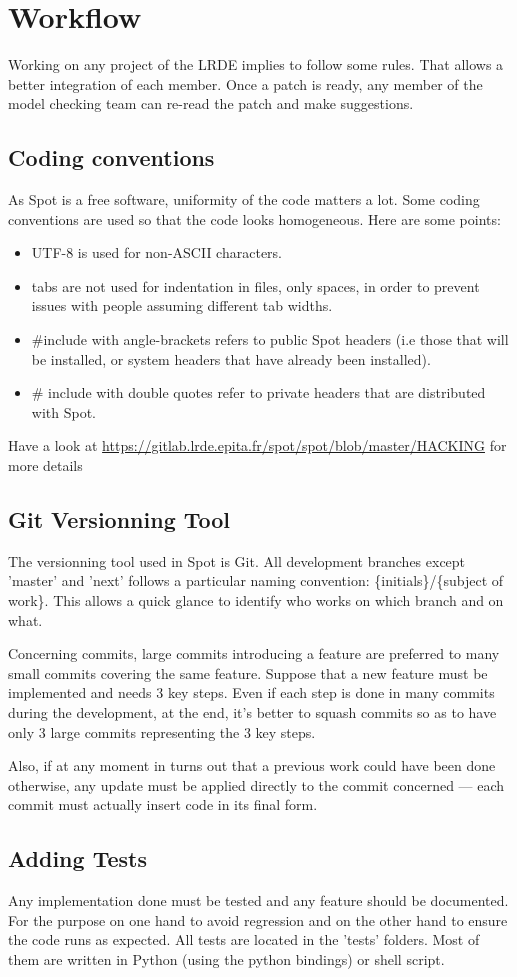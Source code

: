 \section{Workflow}
Working on any project of the LRDE implies to follow some rules. That allows a better integration of each
member. Once a patch is ready, any member of the model checking team can re-read the patch and make
suggestions.

\subsection{Coding conventions}
As Spot is a free software, uniformity of the code matters a lot. Some coding conventions are used so that
the code looks homogeneous. Here are some points:
\begin{itemize}
 \item UTF-8 is used for non-ASCII characters.
 \item tabs are not used for indentation in files, only spaces, in order to prevent issues with people
 assuming different tab widths.
 \item \#include with angle-brackets refers to public Spot headers (i.e those that will be installed, or
 system headers that have already been installed).
 \item \# include with double quotes refer to private headers that are distributed with Spot.
\end{itemize}

Have a look at \url{https://gitlab.lrde.epita.fr/spot/spot/blob/master/HACKING} for more details

\subsection{Git Versionning Tool}
The versionning tool used in Spot is Git. All development branches except 'master' and 'next' follows a
particular naming convention: \{initials\}/\{subject of work\}. This allows a quick glance to identify
who works on which branch and on what.

Concerning commits, large commits introducing a feature are preferred to many small commits covering
the same feature. Suppose that a new feature must be implemented and needs 3 key steps. Even if each step
is done in many commits during the development, at the end, it's better to squash commits so as to have
only 3 large commits representing the 3 key steps.

Also, if at any moment in turns out that a previous work
could have been done otherwise, any update must be applied directly to the commit concerned --- each commit
must actually insert code in its final form.

\subsection{Adding Tests}
Any implementation done must be tested and any feature should be documented. For the purpose on one hand
to avoid regression and on the other hand to ensure the code runs as expected. All tests are located in
the 'tests' folders. Most of them are written in Python (using the python bindings) or shell script.

